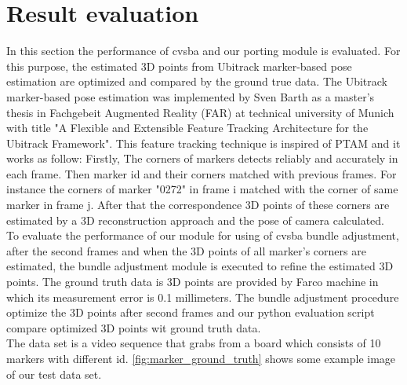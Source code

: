 \section{Result evaluation}
In this section the performance of cvsba and our porting module is evaluated. For this purpose, the estimated 3D points from Ubitrack marker-based pose estimation are optimized and compared by the ground true data. The Ubitrack marker-based pose estimation was implemented by Sven Barth as a master's thesis in Fachgebeit Augmented Reality (FAR) at technical university of Munich with title "A Flexible and Extensible Feature Tracking Architecture for the Ubitrack Framework". This feature tracking technique is inspired of PTAM \cite{klein2007parallel} and it works as follow: Firstly, The corners of markers detects reliably and accurately in each frame. Then marker id and their corners matched with previous frames. For instance the corners of marker "0272" in frame i matched with the corner of same marker in frame j. After that the correspondence 3D points of these corners are estimated by a 3D reconstruction approach and the pose of camera calculated.\\
To evaluate the performance of our module for using of cvsba bundle adjustment, after the second frames and when the 3D points of all marker's corners are estimated, the bundle adjustment module is executed to refine the estimated 3D points. The ground truth data is 3D points are provided by Farco machine in which its measurement error is 0.1 millimeters. The bundle adjustment procedure optimize the 3D points after second frames and our python evaluation script compare optimized 3D points wit ground truth data.\\
The data set is a video sequence that grabs from a board which consists of 10 markers with different id. \autoref{fig:marker_ground_truth} shows some example image of our test data set.
